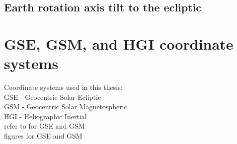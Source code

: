 \subsection*{Earth rotation axis tilt to the ecliptic}


\section{GSE, GSM, and HGI coordinate systems}
\label{sec:coordinate_systems}




Coordinate systems used in this thesis:\\
GSE - Geocentric Solar Ecliptic\\
GSM - Geocentric Solar Magnetospheric\\
HGI - Heliographic Inertial\\

refer to \citet{Hapgood1992} for GSE and GSM\\

figures for GSE and GSM



  

